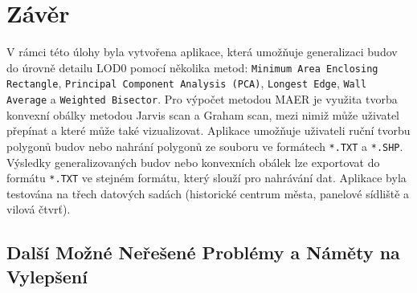 \section{Závěr}

V rámci této úlohy byla vytvořena aplikace, která umožňuje generalizaci budov do úrovně detailu LOD0 pomocí několika metod: \texttt{Minimum Area Enclosing Rectangle}, \texttt{Principal Component Analysis (PCA)}, \texttt{Longest Edge}, \texttt{Wall Average} a \texttt{Weighted Bisector}. Pro výpočet metodou MAER je využita tvorba konvexní obálky metodou Jarvis scan a Graham scan, mezi nimiž může uživatel přepínat a které může také vizualizovat. Aplikace umožňuje uživateli ruční tvorbu polygonů budov nebo nahrání polygonů ze souboru ve formátech \texttt{*.TXT} a \texttt{*.SHP}. Výsledky generalizovaných budov nebo konvexních obálek lze exportovat do formátu \texttt{*.TXT} ve stejném formátu, který slouží pro nahrávání dat. Aplikace byla testována na třech datových sadách (historické centrum města, panelové sídliště a vilová čtvrť).

\subsection{Další Možné Neřešené Problémy a Náměty na Vylepšení}

